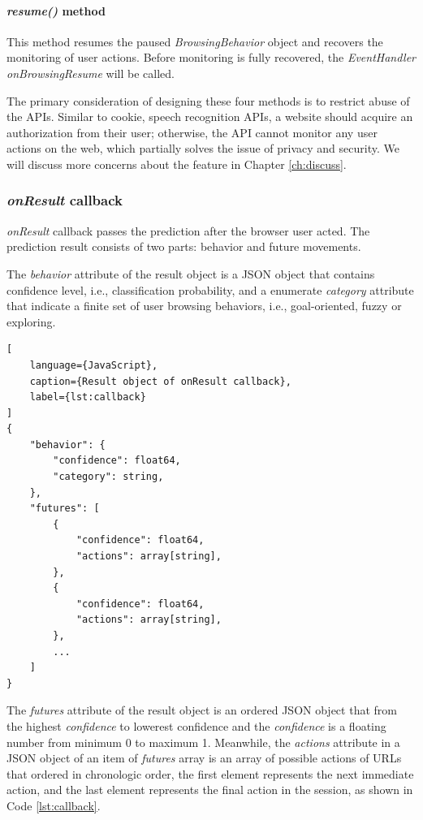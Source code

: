 \paragraph{\emph{resume()} method} This method resumes the paused \emph{BrowsingBehavior}
object and recovers the monitoring of user actions. Before monitoring is fully recovered,
the \emph{EventHandler onBrowsingResume} will be called.

The primary consideration of designing these four methods is to restrict abuse of the APIs.
Similar to cookie, speech recognition APIs, a website should acquire an authorization from
their user; otherwise, the API cannot monitor any user actions on the web, which partially
solves the issue of privacy and security. We will discuss more concerns about the feature in
Chapter \ref{ch:discuss}.

\subsubsection{\emph{onResult} callback}

\emph{onResult} callback passes the prediction after the browser user acted.
The prediction result consists of two parts: behavior and future movements.

The \emph{behavior} attribute of the result object is a JSON object that contains 
confidence level, i.e., classification probability, and a enumerate \emph{category} attribute
that indicate a finite set of user browsing behaviors, i.e., goal-oriented, fuzzy or exploring.

\begin{lstlisting}[
    language={JavaScript},
    caption={Result object of onResult callback},
    label={lst:callback}
]
{
    "behavior": {
        "confidence": float64,
        "category": string,
    },
    "futures": [
        {
            "confidence": float64,
            "actions": array[string],
        },
        {
            "confidence": float64,
            "actions": array[string],
        },
        ...
    ]
}
\end{lstlisting}

The \emph{futures} attribute of the result object is an ordered JSON object that from the
highest \emph{confidence} to lowerest {confidence} and the \emph{confidence} is a floating
number from minimum 0 to maximum 1. Meanwhile, the \emph{actions} attribute in a 
JSON object of an item of \emph{futures} array is an array of possible actions of URLs that
ordered in chronologic order, the first element represents the next immediate action,
and the last element represents the final action in the session, as shown in Code \ref{lst:callback}.

